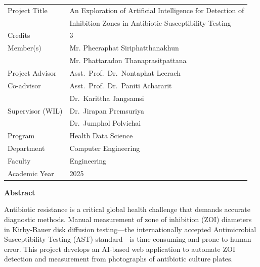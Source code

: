﻿%

\clearpage
{}
{}

\begin{tabular}{@{}lp{10.5cm}@{}}
  Project Title   & An Exploration of Artificial Intelligence for Detection of \\
                  & Inhibition Zones in Antibiotic Susceptibility Testing \\[0.3cm]
  Credits         & 3 \\[0.2cm]
  Member(s)       & Mr. Pheeraphat Siriphatthanakhun \\
                  & Mr. Phattaradon Thanaprasitpattana \\[0.3cm]
  Project Advisor & Asst.\ Prof.\ Dr.\ Nontaphat Leerach \\[0.2cm]
  Co-advisor      & Asst.\ Prof.\ Dr.\ Paniti Achararit \\
                  & Dr.\ Karittha Jangsamsi \\[0.2cm]
  Supervisor (WIL)& Dr.\ Jirapan Premsuriya \\
                  & Dr.\ Jumphol Polvichai \\[0.3cm]
  Program         & Health Data Science \\[0.1cm]
  Department      & Computer Engineering \\[0.1cm]
  Faculty         & Engineering \\[0.1cm]
  Academic Year   & 2025 \\
\end{tabular}

\vspace{1cm}
\begin{center}\textbf{Abstract}\end{center}

\hspace{\parindent}%
Antibiotic resistance is a critical global health challenge that demands accurate diagnostic methods.
Manual measurement of zone of inhibition (ZOI) diameters in Kirby-Bauer disk diffusion testing---the internationally accepted Antimicrobial Susceptibility Testing (AST) standard---is time-consuming and prone to human error.
This project develops an AI-based web application to automate ZOI detection and measurement from photographs of antibiotic culture plates.

